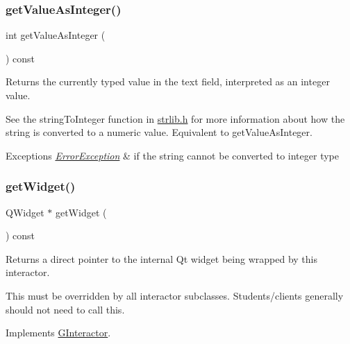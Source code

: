 \subsubsection{\texorpdfstring{get\+Value\+As\+Integer()}{getValueAsInteger()}}
{\footnotesize\ttfamily int get\+Value\+As\+Integer (\begin{DoxyParamCaption}{ }\end{DoxyParamCaption}) const\hspace{0.3cm}{\ttfamily [virtual]}}



Returns the currently typed value in the text field, interpreted as an integer value. 

See the string\+To\+Integer function in \mbox{\hyperlink{strlib_8h_source}{strlib.\+h}} for more information about how the string is converted to a numeric value. Equivalent to get\+Value\+As\+Integer. 
\begin{DoxyExceptions}{Exceptions}
{\em \mbox{\hyperlink{classErrorException}{Error\+Exception}}} & if the string cannot be converted to integer type \\
\hline
\end{DoxyExceptions}
\mbox{\label{classGTextField_a326ee51b5561f807df7b29a1c101f7fd}} 
\subsubsection{\texorpdfstring{get\+Widget()}{getWidget()}}
{\footnotesize\ttfamily Q\+Widget $\ast$ get\+Widget (\begin{DoxyParamCaption}{ }\end{DoxyParamCaption}) const\hspace{0.3cm}{\ttfamily [virtual]}}



Returns a direct pointer to the internal Qt widget being wrapped by this interactor. 

This must be overridden by all interactor subclasses. Students/clients generally should not need to call this. 

Implements \mbox{\hyperlink{classGInteractor}{G\+Interactor}}.

\mbox{\label{classGInteractor_a0ed2965abd4f5701d2cadf71239faf19}} 
